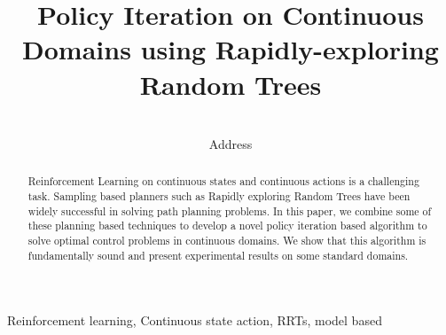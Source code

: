 \documentclass[wcp]{jmlr}
\title[RRTPI]{Policy Iteration on Continuous Domains using Rapidly-exploring Random Trees}
\author{\Name{Author Name1} \Email{abc@sample.com}\and
   \Name{Author Name2} \Email{xyz@sample.com}\\
   \addr Address}
\begin{document}
\maketitle

\begin{abstract}
Reinforcement Learning on continuous states and continuous actions is a challenging task. Sampling based planners such as Rapidly exploring Random Trees have been widely successful in solving path planning problems. In this paper, we combine some of these planning based techniques to develop a novel policy iteration based algorithm to solve optimal control problems in continuous domains. We show that this algorithm is fundamentally sound and present experimental results on some standard domains.
\end{abstract}
\begin{keywords}
Reinforcement learning, Continuous state action, RRTs, model based
\end{keywords}
\end{document}
